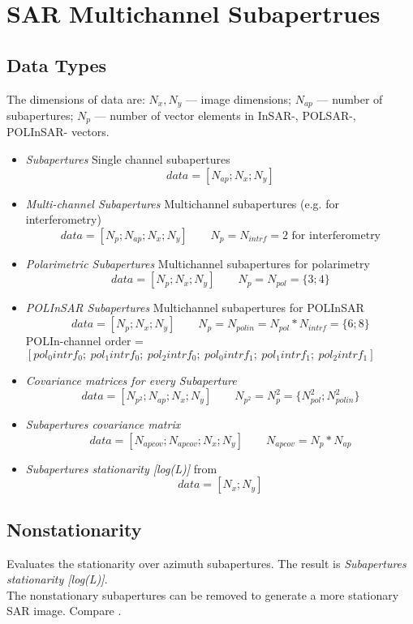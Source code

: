 \chapter{SAR Multichannel Subapertrues}

\section{Data Types}
The dimensions of data are: $N_x,N_y$ --- image dimensions; $N_{ap}$ --- number
of subapertures; $N_p$ --- number of vector elements in InSAR-, POLSAR-, POLInSAR- vectors.
\begin{itemize}
  \item \emph{Subapertures} Single channel subapertures
    \[data = [ N_{ap}; N_x; N_y ]\]
  \item \emph{Multi-channel Subapertures} Multichannel subapertures (e.g. for interferometry)
    \[data = [ N_{p}; N_{ap}; N_x; N_y ] \qquad N_p=N_{intrf}=2\mbox{ for interferometry}\]
  \item \emph{Polarimetric Subapertures} Multichannel subapertures for polarimetry
    \[data = [ N_{p}; N_x; N_y ] \qquad N_p=N_{pol}=\{3;4\}\]
  \item \emph{POLInSAR Subapertures} Multichannel subapertures for POLInSAR
    \[data = [ N_{p}; N_x; N_y ] \qquad N_p=N_{polin}=N_{pol}*N_{intrf}=\{6;8\}\]
    POLIn-channel order = $[ pol_0intrf_0;\ pol_1intrf_0;\ pol_2intrf_0;\ pol_0intrf_1;\ pol_1intrf_1;\ pol_2intrf_1]$
  \item \emph{Covariance matrices for every Subaperture}
    \[data = [ N_{p^2}; N_{ap}; N_x; N_y ] \qquad N_{p^2}=N_p^2=\{N_{pol}^2; N_{polin}^2\}\]
  \item \emph{Subapertures covariance matrix}
    \[data = [ N_{apcov}; N_{apcov}; N_x; N_y ] \qquad N_{apcov}=N_{p}*N_{ap}\]
  \item \emph{Subapertures stationarity [log(L)]} from \cite{ferro-famil03:subap}
    \[data = [ N_x; N_y ]\]
\end{itemize}

\section{Nonstationarity}

Evaluates the stationarity over azimuth subapertures. The result is
\emph{Subapertures stationarity [log(L)]}.\\
The nonstationary subapertures can be removed to generate a more stationary SAR image.
Compare \cite{ferro-famil03:subap}.
